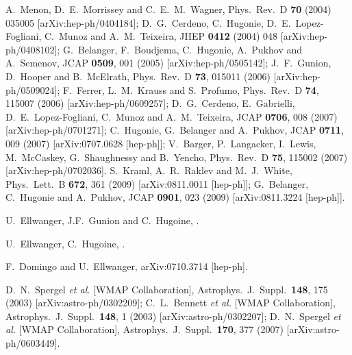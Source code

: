\documentclass[aps,prl,nofootinbib,superscriptaddress]{revtex4}
\begin{document}
\begin{thebibliography}{99}
A.~Menon, D.~E.~Morrissey and C.~E.~M.~Wagner,
  Phys.\ Rev.\  D {\bf 70} (2004) 035005
  [arXiv:hep-ph/0404184];
  D.~G.~Cerdeno, C.~Hugonie, D.~E.~Lopez-Fogliani, C.~Munoz and A.~M.~Teixeira,
  JHEP {\bf 0412} (2004) 048
  [arXiv:hep-ph/0408102];
  G.~Belanger, F.~Boudjema, C.~Hugonie, A.~Pukhov and A.~Semenov,
  JCAP {\bf 0509}, 001 (2005)
  [arXiv:hep-ph/0505142];
  J.~F.~Gunion, D.~Hooper and B.~McElrath,
  Phys.\ Rev.\  D {\bf 73}, 015011 (2006)
  [arXiv:hep-ph/0509024];
  F.~Ferrer, L.~M.~Krauss and S.~Profumo,
  Phys.\ Rev.\  D {\bf 74}, 115007 (2006)
  [arXiv:hep-ph/0609257];
   D.~G.~Cerdeno, E.~Gabrielli, D.~E.~Lopez-Fogliani, C.~Munoz and A.~M.~Teixeira,
  JCAP {\bf 0706}, 008 (2007)
  [arXiv:hep-ph/0701271];
  C.~Hugonie, G.~Belanger and A.~Pukhov,
  JCAP {\bf 0711}, 009 (2007)
  [arXiv:0707.0628 [hep-ph]];
  V.~Barger, P.~Langacker, I.~Lewis, M.~McCaskey, G.~Shaughnessy and B.~Yencho,
  Phys.\ Rev.\  D {\bf 75}, 115002 (2007)
  [arXiv:hep-ph/0702036].
  S.~Kraml, A.~R.~Raklev and M.~J.~White,
  Phys.\ Lett.\  B {\bf 672}, 361 (2009)
  [arXiv:0811.0011 [hep-ph]];
  G.~Belanger, C.~Hugonie and A.~Pukhov,
  JCAP {\bf 0901}, 023 (2009)
  [arXiv:0811.3224 [hep-ph]].
  


 U.~Ellwanger, J.F.~Gunion and C.~Hugoine,
.

 U.~Ellwanger, C.~Hugoine, .

 F.~Domingo and U.~Ellwanger, arXiv:0710.3714 [hep-ph].

  D.~N.~Spergel {\it et al.}  [WMAP Collaboration],
  Astrophys.\ J.\ Suppl.\  {\bf 148}, 175 (2003)
  [arXiv:astro-ph/0302209];
%
  C.~L.~Bennett {\it et al.}  [WMAP Collaboration],
  Astrophys.\ J.\ Suppl.\  {\bf 148}, 1 (2003)
  [arXiv:astro-ph/0302207];
%
  D.~N.~Spergel {\it et al.}  [WMAP Collaboration],
  Astrophys.\ J.\ Suppl.\  {\bf 170}, 377 (2007)
  [arXiv:astro-ph/0603449].  


\end{thebibliography}
\end{document}
